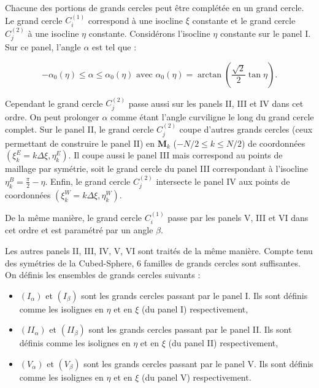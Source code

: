 Chacune des portions de grands cercles peut être complétée en un grand cercle. Le grand cercle $C_i^{(1)}$ correspond à une isocline $\xi$ constante et le grand cercle $C_j^{(2)}$ à une isocline $\eta$ constante. Considérons l'isocline $\eta$ constante sur le panel I. Sur ce panel, l'angle $\alpha$ est tel que :

\begin{equation}
- \alpha_0 (\eta) \leq \alpha \leq \alpha_0(\eta) \text{ avec } \alpha_0( \eta) = \arctan \left( \dfrac{\sqrt{2}}{2} \tan \eta \right).
\end{equation}


Cependant le grand cercle $C_j^{(2)}$ passe aussi sur les panels II, III et IV dans cet ordre. On peut prolonger $\alpha$ comme étant l'angle curviligne le long du grand cercle complet. Sur le panel II, le grand cercle $C_j^{(2)}$ coupe d'autres grands cercles (ceux permettant de construire le panel II) en $\mathbf{M}_k$ ($-N/2 \leq k \leq N/2$) de coordonnées $(\xi^E_k = k \Delta \xi, \eta^E_k)$. Il coupe aussi le panel III mais correspond au points de maillage par symétrie, soit le grand cercle du panel III correspondant à l'isocline $\eta^B_k = \frac{\pi}{2} - \eta$. Enfin, le grand cercle $C_j^{(2)}$ intersecte le panel IV aux points de coordonnées $(\xi^W_k = k \Delta \xi, \eta^W_k)$. 

De la même manière, le grand cercle $C_i^{(1)}$ passe par les panels V, III et VI dans cet ordre et est paramétré par un angle $\beta$.

Les autres panels II, III, IV, V, VI sont traités de la même manière. Compte tenu des symétries de la Cubed-Sphere, 6 familles de grands cercles sont suffisantes. On définis les ensembles de grands cercles suivants :

\begin{itemize}
\item $(I_{\alpha})$ et $(I_{\beta})$ sont les grands cercles passant par le panel I. Ils sont définis comme les isolignes en $\eta$ et en $\xi$ (du panel I) respectivement,
\item $(II_{\alpha})$ et $(II_{\beta})$ sont les grands cercles passant par le panel II. Ils sont définis comme les isolignes en $\eta$ et en $\xi$ (du panel II) respectivement,
\item $(V_{\alpha})$ et $(V_{\beta})$ sont les grands cercles passant par le panel V. Ils sont définis comme les isolignes en $\eta$ et en $\xi$ (du panel V) respectivement.
\end{itemize}


